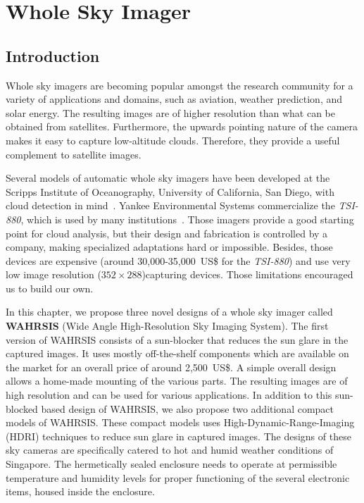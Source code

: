 \chapter{Whole Sky Imager}
\label{chap:wsi}


\section{Introduction}
Whole sky imagers are becoming popular amongst the research community for a variety of applications and domains, such as aviation, weather prediction, and solar energy. The resulting images are of higher resolution than what can be obtained from satellites. Furthermore, the upwards pointing nature of the camera makes it easy to capture low-altitude clouds. Therefore, they provide a useful complement to satellite images.

Several models of automatic whole sky imagers have been developed at the Scripps Institute of Oceanography, University of California, San Diego, with cloud detection in mind~\cite{WSI-history}. Yankee Environmental Systems commercialize the \emph{TSI-880}, which is used by many institutions~\cite{Long,Souza}. Those imagers provide a good starting point for cloud analysis, but their design and fabrication is controlled by a company, making specialized adaptations hard or impossible. Besides, those devices are expensive (around 30,000-35,000~US\$ for the \emph{TSI-880}) and use very low image resolution ($352\times288$)capturing devices. Those limitations encouraged us to build our own.

In this chapter, we propose three novel designs of a whole sky imager called \textbf{WAHRSIS} (Wide Angle High-Resolution Sky Imaging System). The first version of WAHRSIS consists of a sun-blocker that reduces the sun glare in the captured images. It uses mostly off-the-shelf components which are available on the market for an overall price of around 2,500~US\$. A simple overall design allows a home-made mounting of the various parts. The resulting images are of high resolution and can be used for various applications. In addition to this sun-blocked based design of WAHRSIS, we also propose two additional compact models of WAHRSIS. These compact models uses High-Dynamic-Range-Imaging (HDRI) techniques to reduce sun glare in captured images. The designs of these sky cameras are specifically catered to hot and humid weather conditions of Singapore. The hermetically sealed enclosure needs to operate at permissible temperature and humidity levels for proper functioning of the several electronic items, housed inside the enclosure.

